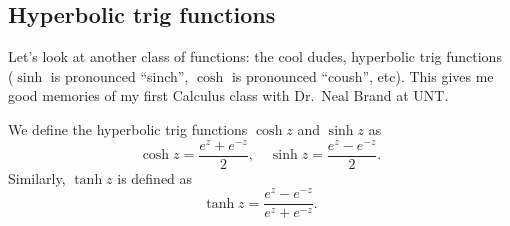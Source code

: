 \subsection{Hyperbolic trig functions}
Let's look at another class of functions: the cool dudes, hyperbolic trig functions ($\sinh$ is pronounced ``sinch'', $\cosh$ is pronounced ``coush'', etc). This gives me good memories of my first Calculus class with Dr.\ Neal Brand at UNT.
\begin{definition}
    We define the hyperbolic trig functions $\cosh z$ and $\sinh z $ as \[
    \cosh z = \frac{e^{z}+e^{-z}}{2},\quad \sinh z = \frac{e^{z}-e^{-z}}{2}.
    \] Similarly, $\tanh z$ is defined as \[
    \tanh z = \frac{e^{z}-e^{-z}}{e^{z}+e^{-z}}.
    \] 
\end{definition}


